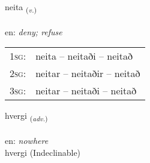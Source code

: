 \documentclass[frontgrid, backgrid]{flacards}\usepackage[]{graphicx}\usepackage[]{color}
\begin{document}
\renewcommand{\flhead}{\vskip5pt \fboxsep=0pt {\small\bfseries\footnotesize Sagnorð | Verb}}
\renewcommand{\fcfoot}{\vskip5pt \fboxsep=0pt \hspace{2pt}{\small\bfseries\footnotesize 2K}}

\renewcommand{\blhead}{\vskip5pt {\small\bfseries\footnotesize Sagnorð | Verb }}
\renewcommand{\bcfoot}{\vskip5pt \hspace{2pt}{\small\bfseries\footnotesize 2K}}


{neita \small{\textsubscript{(\textit{v.})}} \\[1ex] %
\textphonetic{[neiːta]} \\
en: \emph{deny; refuse} \\  [2ex]
\renewcommand*{\arraystretch}{0.8}
\begin{tabular}{p{1cm}l}
\textsc{1sg}: & neita -- neitaði -- neitað \\ 
\textsc{2sg}: & neitar -- neitaðir -- neitað \\ 
\textsc{3sg}: & neitar -- neitaði -- neitað \\ 
\end{tabular}
}


\renewcommand{\flhead}{\vskip5pt \fboxsep=0pt {\small\bfseries\footnotesize Atviksorð | Adverb}}
\renewcommand{\fcfoot}{\vskip5pt \fboxsep=0pt \hspace{2pt}{\small\bfseries\footnotesize 2K}}

\renewcommand{\blhead}{\vskip5pt {\small\bfseries\footnotesize Atviksorð | Adverb }}
\renewcommand{\bcfoot}{\vskip5pt \hspace{2pt}{\small\bfseries\footnotesize 2K}}


{hvergi \small{\textsubscript{(\textit{adv.})}} \\[1ex]
\textphonetic{[kʰvɛrcɪ]} \\
en: \emph{nowhere} \\  [2ex]
hvergi (Indeclinable)}

\renewcommand{\flhead}{\vskip5pt \fboxsep=0pt {\small\bfseries\footnotesize Lýsingarorð | Adjective}}
\renewcommand{\fcfoot}{\vskip5pt \fboxsep=0pt \hspace{2pt}{\small\bfseries\footnotesize 2K}}
\end{document}
